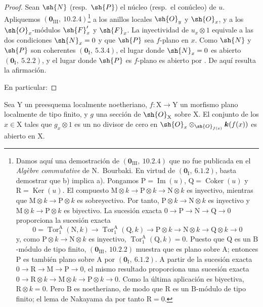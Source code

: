 \begin{proof}
Sean $\sh{N}$ (resp.\ $\sh{P}$) el núcleo (resp.\ el conúcleo) de $u$.
Apliquemos $(\mathbf{0}_{\mathrm{III}},~10.2.4)$\footnote{Damos aquí una demostración de
$(\mathbf{0}_{\mathrm{III}},~10.2.4)$ que no fue publicada en el
\emph{Alg\`ebre commutative} de N.~Bourbaki. En virtud de
$(\mathbf{0}_\mathrm{I},~6.1.2)$, basta demostrar que b) implica a).
Pongamos $\mathrm{P}=\operatorname{Im}(u)$,
$\mathrm{Q}=\operatorname{Coker}(u)$ y
$\mathrm{R}=\operatorname{Ker}(u)$. El compuesto
$\mathrm{M}\otimes k\to\mathrm{P}\otimes k\to\mathrm{N}\otimes k$ es
inyectivo, mientras que $\mathrm{M}\otimes k\to\mathrm{P}\otimes k$ es
sobreyectivo. Por tanto, $\mathrm{P}\otimes k\to\mathrm{N}\otimes k$ es
inyectivo y $\mathrm{M}\otimes k\to\mathrm{P}\otimes k$ es biyectivo.
La sucesión exacta $0\to\mathrm{P}\to\mathrm{N}\to\mathrm{Q}\to0$ proporciona
la sucesión exacta
\[
0=\operatorname{Tor}_1^\mathrm{A}(\mathrm{N},k)\to\operatorname{Tor}_1^\mathrm{A}(\mathrm{Q},k)\to\mathrm{P}\otimes k\to\mathrm{N}\otimes k\to\mathrm{Q}\otimes k\to 0
\]
y, como $\mathrm{P}\otimes k\to\mathrm{N}\otimes k$ es inyectivo,
$\operatorname{Tor}_1^\mathrm{A}(\mathrm{Q},k)=0$. Puesto que $\mathrm{Q}$ es un
$\mathrm{B}$-módulo de tipo finito,
$(\mathbf{0}_{\mathrm{III}},~10.2.2)$ muestra que es plano sobre
$\mathrm{A}$; entonces $\mathrm{P}$ es también plano sobre $\mathrm{A}$ por
$(\mathbf{0}_\mathrm{I},~6.1.2)$. A partir de la sucesión exacta
$0\to\mathrm{R}\to\mathrm{M}\to\mathrm{P}\to0$, el mismo resultado proporciona una
sucesión exacta
$0\to\mathrm{R}\otimes k\to\mathrm{M}\otimes k\to
\mathrm{P}\otimes k\to0$. Como la última aplicación es biyectiva,
$\mathrm{R}\otimes k=0$. Pero $\mathrm{B}$ es noetheriano, de modo que
$\mathrm{R}$ es un $\mathrm{B}$-módulo de tipo finito; el lema de Nakayama
da por tanto $\mathrm{R}=0$.}
a los anillos locales $\sh{O}_y$ y $\sh{O}_x$, y a los
$\sh{O}_x$-módulos $\sh{F}'_x$ y $\sh{F}_x$. La inyectividad de
$u_x\otimes1$ equivale a las dos condiciones
$\sh{N}_x=0$ y que $\sh{P}$ sea $f$-plano en $x$. Como
$\sh{N}$ y $\sh{P}$ son coherentes $(\mathbf{0}_\mathrm{I},~5.3.4)$,
el lugar donde $\sh{N}_x=0$ es abierto
$(\mathbf{0}_\mathrm{I},~5.2.2)$, y el lugar donde $\sh{P}$ es
$f$-plano es abierto por . De aquí resulta la afirmación.

En particular:
\end{proof}

\begin{corollary}[11.1.3]
\label{IV.11.1.3}
Sea $\mathrm{Y}$ un preesquema localmente noetheriano,
$f:\mathrm{X}\to\mathrm{Y}$ un morfismo plano localmente de tipo finito, y
$g$ una sección de $\sh{O}_\mathrm{X}$ sobre $\mathrm{X}$. El conjunto de los
$x\in\mathrm{X}$ tales que $g_x\otimes 1$ es un no divisor de cero en
$\sh{O}_x\otimes_{\sh{O}_{f(x)}}\boldsymbol{k}(f(x))$ es abierto en
$\mathrm{X}$.
\end{corollary}

